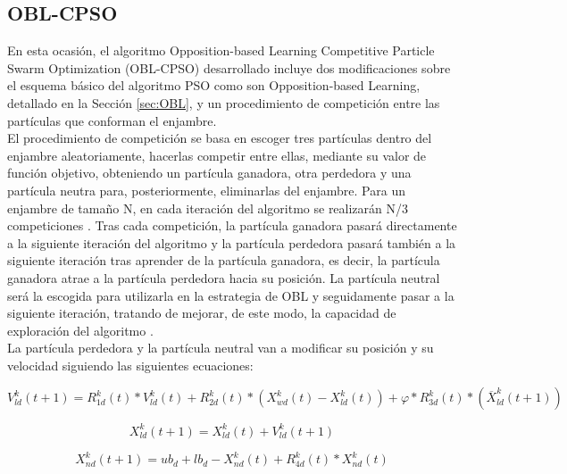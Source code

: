 
\subsection{OBL-CPSO}
En esta ocasión, el algoritmo Opposition-based Learning Competitive Particle Swarm Optimization (OBL-CPSO) \cite{oblcpso} desarrollado incluye dos modificaciones sobre el esquema básico del algoritmo PSO como son Opposition-based Learning, detallado en la Sección \ref{sec:OBL}, y un procedimiento de competición entre las partículas que conforman el enjambre. \\

El procedimiento de competición se basa en escoger tres partículas dentro del enjambre aleatoriamente, hacerlas competir entre ellas, mediante su valor de función objetivo, obteniendo un partícula ganadora, otra perdedora y una partícula neutra para, posteriormente, eliminarlas del enjambre. Para un enjambre de tamaño N, en cada iteración del algoritmo se realizarán N/3 competiciones \cite{oblcpso}. Tras cada competición, la partícula ganadora pasará directamente a la siguiente iteración del algoritmo y la partícula perdedora pasará también a la siguiente iteración tras aprender de la partícula ganadora, es decir, la partícula ganadora atrae a la partícula perdedora hacia su posición. La partícula neutral será la escogida para utilizarla en la estrategia de OBL y seguidamente pasar a la siguiente iteración, tratando de mejorar, de este modo, la capacidad de exploración del algoritmo \cite{oblcpso}. \\

La partícula perdedora y la partícula neutral van a modificar su posición y su velocidad siguiendo las siguientes ecuaciones:

\begin{equation} \label{eq:7}
    V^{k}_{ld}(t+1) = R^{k}_{1d}(t) * V^{k}_{ld}(t) + R^{k}_{2d}(t) * (X^{k}_{wd}(t) - X^{k}_{ld}(t)) + \varphi * R^{k}_{3d}(t) * (\overline{X}^{k}_{ld}(t+1)) 
\end{equation}

\begin{equation} \label{eq:8}
     X^{k}_{ld}(t+1) = X^{k}_{ld}(t) + V^{k}_{ld}(t+1)
\end{equation}

\begin{equation} \label{eq:9}
     X^{k}_{nd}(t+1) = ub_{d} + lb_{d} - X^{k}_{nd}(t) + R^{k}_{4d}(t) * X^{k}_{nd}(t)
\end{equation}

